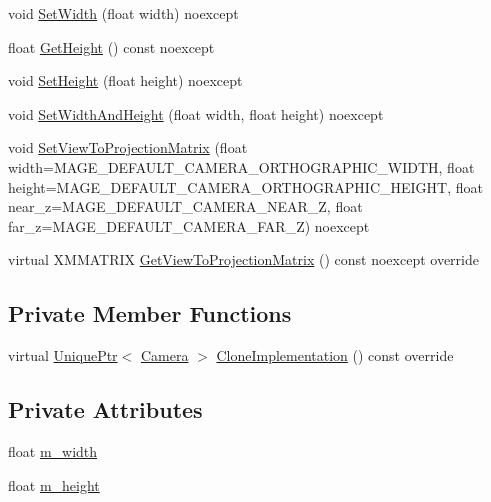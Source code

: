\begin{DoxyCompactItemize}
void \hyperlink{classmage_1_1_orthographic_camera_a0e9cb7aa45b2b44b96ac0ea17e530717}{Set\+Width} (float width) noexcept
\item 
float \hyperlink{classmage_1_1_orthographic_camera_ac9ee4cae43058876aa5ff77db75a9e25}{Get\+Height} () const noexcept
\item 
void \hyperlink{classmage_1_1_orthographic_camera_a8b1c440a48905805e261034f756aeab6}{Set\+Height} (float height) noexcept
\item 
void \hyperlink{classmage_1_1_orthographic_camera_a876cb126a17d070ff3a5a20451e1c509}{Set\+Width\+And\+Height} (float width, float height) noexcept
\item 
void \hyperlink{classmage_1_1_orthographic_camera_af0c39e7ad5271f1b78437aa54275c3e3}{Set\+View\+To\+Projection\+Matrix} (float width=M\+A\+G\+E\+\_\+\+D\+E\+F\+A\+U\+L\+T\+\_\+\+C\+A\+M\+E\+R\+A\+\_\+\+O\+R\+T\+H\+O\+G\+R\+A\+P\+H\+I\+C\+\_\+\+W\+I\+D\+TH, float height=M\+A\+G\+E\+\_\+\+D\+E\+F\+A\+U\+L\+T\+\_\+\+C\+A\+M\+E\+R\+A\+\_\+\+O\+R\+T\+H\+O\+G\+R\+A\+P\+H\+I\+C\+\_\+\+H\+E\+I\+G\+HT, float near\+\_\+z=M\+A\+G\+E\+\_\+\+D\+E\+F\+A\+U\+L\+T\+\_\+\+C\+A\+M\+E\+R\+A\+\_\+\+N\+E\+A\+R\+\_\+Z, float far\+\_\+z=M\+A\+G\+E\+\_\+\+D\+E\+F\+A\+U\+L\+T\+\_\+\+C\+A\+M\+E\+R\+A\+\_\+\+F\+A\+R\+\_\+Z) noexcept
\item 
virtual X\+M\+M\+A\+T\+R\+IX \hyperlink{classmage_1_1_orthographic_camera_a970dc089a2463d74ae186884fa2b9b0c}{Get\+View\+To\+Projection\+Matrix} () const noexcept override
\end{DoxyCompactItemize}
\subsection*{Private Member Functions}
\begin{DoxyCompactItemize}
\item 
virtual \hyperlink{namespacemage_a8c307fbcc33bce9b7f2aa4c26c3b95cf}{Unique\+Ptr}$<$ \hyperlink{classmage_1_1_camera}{Camera} $>$ \hyperlink{classmage_1_1_orthographic_camera_aeef89cff8f4272b1412fa3ce366e656d}{Clone\+Implementation} () const override
\end{DoxyCompactItemize}
\subsection*{Private Attributes}
\begin{DoxyCompactItemize}
\item 
float \hyperlink{classmage_1_1_orthographic_camera_aadef4cff19cc1b1ecf427f82bbc3ea6a}{m\+\_\+width}
\item 
float \hyperlink{classmage_1_1_orthographic_camera_a63169098f604874c1b30c4b276b5a3e1}{m\+\_\+height}
\end{DoxyCompactItemize}
